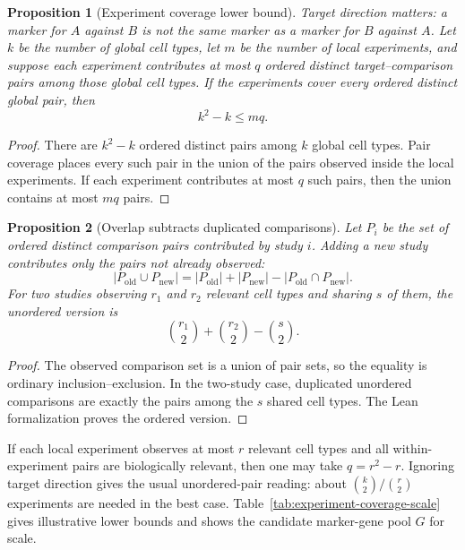 \documentclass{article}
\newtheorem{proposition}{Proposition}
\begin{document}
\begin{proposition}[Experiment coverage lower bound]\label{prop:experiment-coverage-lower-bound}
Target direction matters: a marker for $A$ against $B$ is not the same marker as a marker for $B$ against $A$. Let $k$ be the number of global cell types, let $m$ be the number of local experiments, and suppose each experiment contributes at most $q$ ordered distinct target--comparison pairs among those global cell types. If the experiments cover every ordered distinct global pair, then
\[
  k^2-k \leq m q.
\]
\end{proposition}

\begin{proof}
There are $k^2-k$ ordered distinct pairs among $k$ global cell types. Pair coverage places every such pair in the union of the pairs observed inside the local experiments. If each experiment contributes at most $q$ such pairs, then the union contains at most $mq$ pairs.
\end{proof}

\begin{proposition}[Overlap subtracts duplicated comparisons]\label{prop:experiment-overlap-correction}
Let $P_i$ be the set of ordered distinct comparison pairs contributed by study $i$. Adding a new study contributes only the pairs not already observed:
\[
  \left|P_{\mathrm{old}}\cup P_{\mathrm{new}}\right|
  =
  \left|P_{\mathrm{old}}\right|
  +
  \left|P_{\mathrm{new}}\right|
  -
  \left|P_{\mathrm{old}}\cap P_{\mathrm{new}}\right|.
\]
For two studies observing $r_1$ and $r_2$ relevant cell types and sharing $s$ of them, the unordered version is
\[
  \binom{r_1}{2}+\binom{r_2}{2}-\binom{s}{2}.
\]
\end{proposition}

\begin{proof}
The observed comparison set is a union of pair sets, so the equality is ordinary inclusion--exclusion. In the two-study case, duplicated unordered comparisons are exactly the pairs among the $s$ shared cell types. The Lean formalization proves the ordered version.
\end{proof}

If each local experiment observes at most $r$ relevant cell types and all within-experiment pairs are biologically relevant, then one may take $q=r^2-r$. Ignoring target direction gives the usual unordered-pair reading: about $\binom{k}{2}/\binom{r}{2}$ experiments are needed in the best case. Table~\ref{tab:experiment-coverage-scale} gives illustrative lower bounds and shows the candidate marker-gene pool $G$ for scale.
\end{document}
